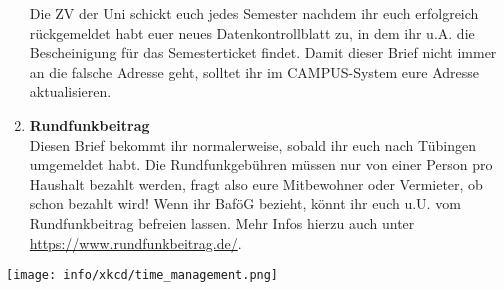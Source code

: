 \begin{enumerate}[label=$\bigcirc$]
		Die ZV der Uni schickt euch jedes Semester nachdem ihr euch erfolgreich rückgemeldet habt euer neues Datenkontrollblatt zu, in dem ihr u.A. die Bescheinigung für das Semesterticket findet. Damit dieser Brief nicht immer an die falsche Adresse geht, solltet ihr im CAMPUS-System eure Adresse aktualisieren.
	\item \textbf{Rundfunkbeitrag} \\
		Diesen Brief bekommt ihr normalerweise, sobald ihr euch nach Tübingen umgemeldet habt. Die Rundfunkgebühren müssen nur von einer Person pro Haushalt bezahlt werden, fragt also eure Mitbewohner oder Vermieter, ob schon bezahlt wird! Wenn ihr BaföG bezieht, könnt ihr euch u.U. vom Rundfunkbeitrag befreien lassen. Mehr Infos hierzu auch unter \url{https://www.rundfunkbeitrag.de/}.
  \end{enumerate}

\begin{center}
\texttt{[image: info/xkcd/time\_management.png]}
\end{center}

